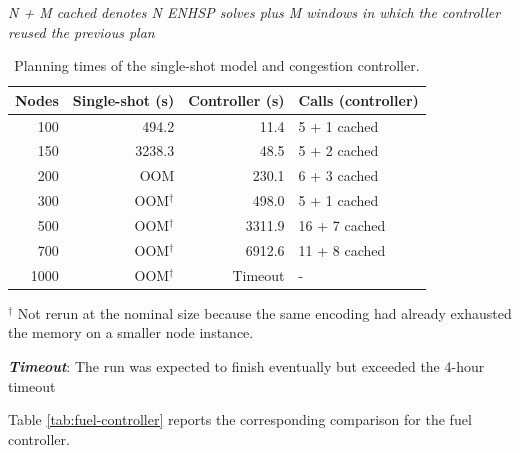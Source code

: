 \documentclass[10pt]{article}
\begin{document}
\begin{table}[H]
\centering
\caption{Planning times of the single-shot model and congestion controller.}
\emph{{N + M cached} denotes N ENHSP solves plus M windows in which the
controller reused the previous plan}
\label{tab:cong-controller}
\begin{tabular}{rrrl}
\toprule
Nodes & Single-shot (s) & Controller (s) & Calls (controller) \\
\midrule
100  & 494.2            & 11.4    & 5 + 1 cached  \\
150  & 3238.3           & 48.5    & 5 + 2 cached  \\
200  & OOM              & 230.1   & 6 + 3 cached  \\
300  & OOM$^{\dagger}$  & 498.0   & 5 + 1 cached  \\
500  & OOM$^{\dagger}$  & 3311.9  & 16 + 7 cached \\
700  & OOM$^{\dagger}$  & 6912.6  & 11 + 8 cached \\
1000 & OOM$^{\dagger}$  & Timeout & -             \\
\bottomrule
\end{tabular}


\vspace{0.25em}
\begin{minipage}{0.95\linewidth}
\footnotesize
$^\dagger$ Not rerun at the nominal size because the same encoding had already
exhausted the memory on a smaller node instance.
\end{minipage}
\begin{minipage}{0.95\linewidth}
\footnotesize
\textit{\textbf{Timeout}}: The run was expected to finish eventually but exceeded the 4-hour timeout
\end{minipage}
\end{table}

Table \ref{tab:fuel-controller} reports the corresponding comparison for the fuel controller.
\end{document}
